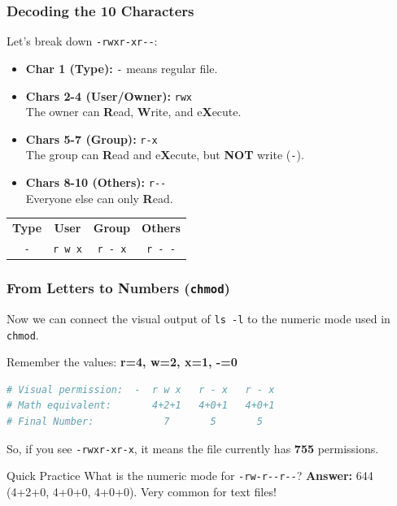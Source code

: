\begin{frame}[fragile]
\frametitle{Decoding the 10 Characters}
Let's break down \verb|-rwxr-xr--|:

\begin{itemize}
    \item \textbf{Char 1 (Type):} \texttt{-} means regular file. 
    \item \textbf{Chars 2-4 (User/Owner):} \texttt{rwx} \\
          The owner can \textbf{R}ead, \textbf{W}rite, and e\textbf{X}ecute.
    \item \textbf{Chars 5-7 (Group):} \texttt{r-x} \\
          The group can \textbf{R}ead and e\textbf{X}ecute, but \textbf{NOT} write (\texttt{-}).
    \item \textbf{Chars 8-10 (Others):} \verb|r--| \\
          Everyone else can only \textbf{R}ead.
\end{itemize}

\begin{table}
    \centering
    \begin{tabular}{c c c c}
        \textbf{Type} & \textbf{User} & \textbf{Group} & \textbf{Others} \\
        \texttt{-} & \texttt{r w x} & \texttt{r - x} & \texttt{r - -}
    \end{tabular}
\end{table}
\end{frame}

\begin{frame}[fragile]
\frametitle{From Letters to Numbers (\texttt{chmod})}
Now we can connect the visual output of \texttt{ls -l} to the numeric mode used in \texttt{chmod}.
\vspace{0.5em}

Remember the values: \textbf{r=4, w=2, x=1, -=0}

\begin{lstlisting}[language=bash]
# Visual permission:  -  r w x   r - x   r - x
# Math equivalent:       4+2+1   4+0+1   4+0+1
# Final Number:            7       5       5
\end{lstlisting}

So, if you see \texttt{-rwxr-xr-x}, it means the file currently has \textbf{755} permissions.
\vspace{0.5em}

\begin{block}{Quick Practice}
What is the numeric mode for \verb|-rw-r--r--|?
\pause %
\newline
\textbf{Answer:} 644 (4+2+0, 4+0+0, 4+0+0). Very common for text files!
\end{block}
\end{frame}


